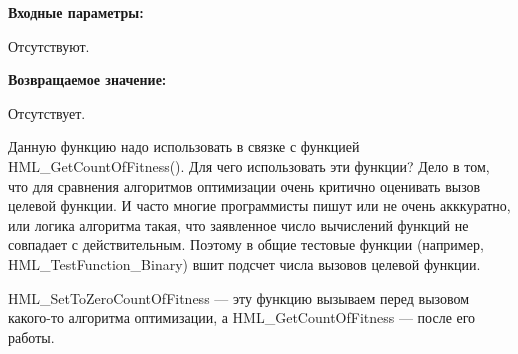 \textbf{Входные параметры:}

Отсутствуют.

\textbf{Возвращаемое значение:}
 
Отсутствует.

Данную функцию надо использовать в связке с функцией HML\_GetCountOfFitness(). Для чего использовать эти функции? Дело в том, что для сравнения алгоритмов оптимизации очень критично оценивать вызов целевой функции. И часто многие программисты пишут или не очень акккуратно, или логика алгоритма такая, что заявленное число вычислений функций не совпадает с действительным. Поэтому в общие тестовые функции (например, HML\_TestFunction\_Binary) вшит подсчет числа вызовов целевой функции.

HML\_SetToZeroCountOfFitness --- эту функцию вызываем перед вызовом какого-то алгоритма оптимизации, а HML\_GetCountOfFitness --- после его работы.